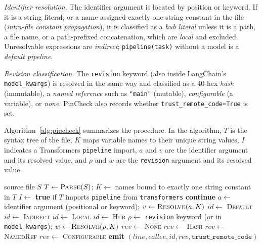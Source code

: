 \documentclass[conference]{IEEEtran}
\begin{document}
\textit{Identifier resolution.} The identifier argument is located by position or keyword. If it is a string literal, or a name assigned exactly one string constant in the file (\emph{intra-file constant propagation}), it is classified as a \emph{hub literal} unless it is a path, a file name, or a path-prefixed concatenation, which are \emph{local} and excluded. Unresolvable expressions are \emph{indirect}; \texttt{pipeline(task)} without a model is a \emph{default pipeline}.

\textit{Revision classification.} The \texttt{revision} keyword (also inside LangChain's \texttt{model\_kwargs}) is resolved in the same way and classified as a 40-hex \emph{hash} (immutable), a \emph{named reference} such as \texttt{"main"} (mutable), \emph{configurable} (a variable), or \emph{none}. PinCheck also records whether \texttt{trust\_remote\_code=True} is set.

Algorithm~\ref{alg:pincheck} summarizes the procedure. In the algorithm, $T$ is the syntax tree of the file, $K$ maps variable names to their unique string values, $I$ indicates a Transformers \texttt{pipeline} import, $a$ and $v$ are the identifier argument and its resolved value, and $\rho$ and $w$ are the \texttt{revision} argument and its resolved value.

\begin{algorithm}[t]
\caption{PinCheck call-site classification}
\label{alg:pincheck}
\footnotesize
\begin{algorithmic}[1]
\Require source file $S$
\State $T \gets \textsc{Parse}(S)$; $K \gets$ names bound to exactly one string constant in $T$
\State $I \gets$ \textbf{true} if $T$ imports \texttt{pipeline} from \texttt{transformers}
   \State \textbf{continue} \EndIf
  \State $a \gets$ identifier argument (positional or keyword); $v \gets \textsc{Resolve}(a, K)$
   \State $id \gets$ \textsc{Default}
   \State $id \gets$ \textsc{Indirect}
   \State $id \gets$ \textsc{Local} 
  \Else \State $id \gets$ \textsc{Hub}
  \EndIf
  \State $\rho \gets$ \texttt{revision} keyword (or in \texttt{model\_kwargs}); $w \gets \textsc{Resolve}(\rho, K)$
   \State $rev \gets$ \textsc{None}
   \State $rev \gets$ \textsc{Hash}
   \State $rev \gets$ \textsc{NamedRef}
  \Else \State $rev \gets$ \textsc{Configurable}
  \EndIf
  \State \textbf{emit} $(line, callee, id, rev, \texttt{trust\_remote\_code})$
\EndFor
\end{algorithmic}
\end{algorithm}
\end{document}
